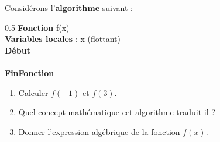 \begin{boxexstheorieligne}
\exo
Considérons l'{\bf algorithme} suivant :

\vspace{3mm}
\begin{center}
\begin{affichagealgorithme}{0.5}
\textbf{Fonction} f(x)\\
\textbf{Variables locales} : x (flottant)\\
\textbf{Début}\\
\\
\textbf{FinFonction}
\end{affichagealgorithme}
\end{center}

\makeatletter
\begin{enumerate}[label=\alph*),itemsep=0mm]
\item Calculer $f(-1)$ et $f(3)$.\par\nobreak\@nobreaktrue
\item Quel concept mathématique cet algorithme traduit-il ?\par\nobreak\@nobreaktrue
\item Donner l'expression algébrique de la fonction $f(x)$. \par\nobreak\@nobreaktrue
\end{enumerate}
\makeatother


\end{boxexstheorieligne}
